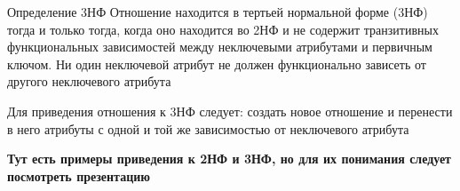 \documentclass[12pt]{article}
\begin{document}
\begin{defin}{Определение 3НФ}
    Отношение находится в тертьей нормальной форме (3НФ) тогда и только тогда, когда оно находится во 2НФ и не содержит транзитивных функциональных зависимостей между неключевыми атрибутами и первичным ключом. Ни один неключевой атрибут не должен функционально зависеть от другого неключевого атрибута

    Для приведения отношения к 3НФ следует: создать новое отношение и перенести в него атрибуты с одной и той же зависимостью от неключевого атрибута 
\end{defin}

\textbf{Тут есть примеры приведения к 2НФ и 3НФ, но для их понимания следует посмотреть презентацию}
\end{document}
